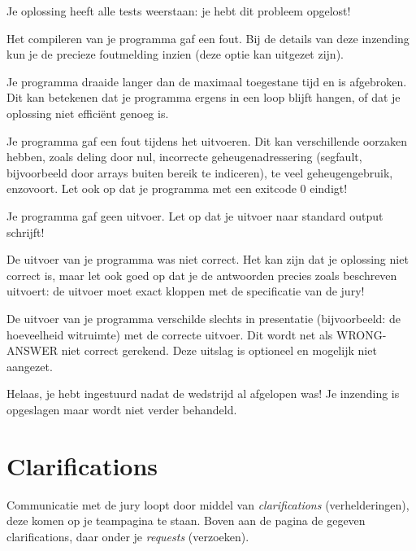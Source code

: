 \begin{description}[\setleftmargin{4.5cm}]
\item[CORRECT]
Je oplossing heeft alle tests weerstaan: je hebt dit probleem opgelost!

\item[COMPILER-ERROR]
Het compileren van je programma gaf een fout. Bij de details
van deze inzending kun je de precieze foutmelding inzien
(deze optie kan uitgezet zijn).

\item[TIMELIMIT]
Je programma draaide langer dan de maximaal toegestane tijd en is
afgebroken. Dit kan betekenen dat je programma ergens in een loop
blijft hangen, of dat je oplossing niet effici\"ent genoeg is.

\item[RUN-ERROR]
Je programma gaf een fout tijdens het uitvoeren. Dit kan verschillende
oorzaken hebben, zoals deling door nul, incorrecte geheugen\-adressering
(segfault, bijvoorbeeld door arrays buiten bereik te indiceren), te
veel geheugengebruik, enzovoort.
Let ook op dat je programma met een exitcode 0 eindigt!

\item[NO-OUTPUT]
Je programma gaf geen uitvoer. Let op dat je uitvoer naar standard
output schrijft!

\item[WRONG-ANSWER]
De uitvoer van je programma was niet correct. Het kan zijn dat je
oplossing niet correct is, maar let ook goed op dat je de antwoorden
precies zoals beschreven uitvoert: de uitvoer moet exact kloppen met
de specificatie van de jury!

\item[PRESENTATION-ERROR]
De uitvoer van je programma verschilde slechts in presentatie
(bijvoorbeeld: de hoeveelheid witruimte) met de correcte uitvoer.
Dit wordt net als WRONG-ANSWER niet correct gerekend. Deze uitslag
is optioneel en mogelijk niet aangezet.

\item[TOO-LATE]
Helaas, je hebt ingestuurd nadat de wedstrijd al afgelopen was!
Je inzending is opgeslagen maar wordt niet verder behandeld.
\end{description}

\section{Clarifications}

Communicatie met de jury loopt door middel van \emph{clarifications}
(verhelderingen), deze komen op je teampagina te staan. Boven aan de
pagina de gegeven clarifications, daar onder je \emph{requests} (verzoeken).

